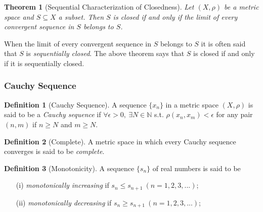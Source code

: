 \documentclass{article}
\newtheorem{theorem}{Theorem}[section]
\numberwithin{theorem}{subsection}
\numberwithin{theorem}{subsubsection}
\theoremstyle{definition}
\newtheorem{definition}{Definition}[section]
\numberwithin{definition}{subsection}
\numberwithin{definition}{subsubsection}
\begin{document}
\begin{theorem}[Sequential Characterization of Closedness]
    Let $(X,\rho)$ be a metric space and $S \subseteq X$ a subset. Then $S$ is closed if and only if the limit of every convergent sequence in $S$ belongs to $S$.
\end{theorem}

When the limit of every convergent sequence in $S$ belongs to $S$ it is often said that $S$ is \textit{sequentially closed}. The above theorem says that $S$ is closed if and only if it is sequentially closed.
\\


\subsubsection{Cauchy Sequence} 

\begin{definition}[Cauchy Sequence]
    A sequence $\{x_{n}\}$ in a metric space $(X,\rho)$ is said to be a \textit{Cauchy sequence} if $\forall \epsilon > 0,\ \exists N \in \mathbb{N}$ s.t. $\rho(x_{n},x_{m}) < \epsilon$ for any pair $(n,m)$ if $n \geq N$ and $m \geq N$.
\end{definition}

\begin{definition}[Complete]
    A metric space in which every Cauchy sequence converges is said to be \textit{complete}.
\end{definition}

\begin{definition}[Monotonicity]
    A sequence $\{s_{n}\}$ of real numbers is said to be
    \begin{itemize}
        \item[(i)] \textit{monotonically increasing} if $s_{n} \leq s_{n+1}\ (n = 1,2,3,...)$;
        \item[(ii)] \textit{monotonically decreasing} if $s_{n} \geq s_{n+1}\ (n = 1,2,3,...)$;
    \end{itemize}
\end{definition}


\begin{comment}
======================================================================================================================================================================================================================================================================================COMPLEX ANALYSIS================================================ ====================================================================================================================================================================================================================================
\end{comment}
\end{document}
